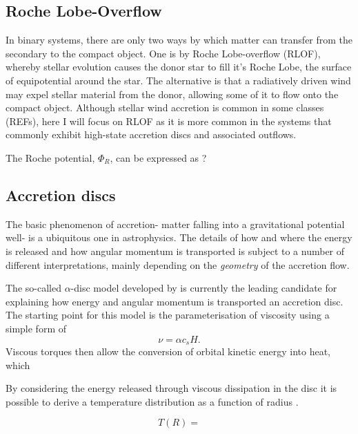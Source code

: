 \subsection{Roche Lobe-Overflow}

In binary systems, there are only two ways by which matter can transfer 
from the secondary to the compact object. One is by Roche Lobe-overflow (RLOF),
whereby stellar evolution causes the donor star to fill it's Roche Lobe, the surface
of equipotential around the star. The alternative is that a radiatively driven wind
may expel stellar material from the donor, allowing some of it to flow onto the compact object.
Although stellar wind accretion is common in some classes (REFs), here I will focus on 
RLOF as it is more common in the systems that commonly exhibit high-state accretion discs
and associated outflows.

The Roche potential, $\Phi_R$, can be expressed as ?



\subsection{Accretion discs}

The basic phenomenon of accretion- matter falling into a gravitational potential well- 
is a ubiquitous one in astrophysics. The details of how and where the energy is released
and how angular momentum is transported is subject to a number of different 
interpretations, mainly depending on the {\em geometry} of the accretion flow.




The so-called $\alpha$-disc model developed by \cite[][hereafter SS73]{shakurasunyaev1973} is
currently the leading candidate for explaining how energy and angular momentum
is transported an accretion disc. The starting point for this model is the parameterisation
of viscosity using a simple form of
\begin{equation}
\nu = \alpha c_s H.
\end{equation}
Viscous torques then allow the conversion of orbital kinetic energy into heat, which 


By considering the energy released through viscous dissipation 
in the disc it is possible to derive a temperature distribution as a function of 
radius \citep{shakurasunyaev1973, fkrbook}. 

\begin{equation}
T(R) =  
\end{equation}

